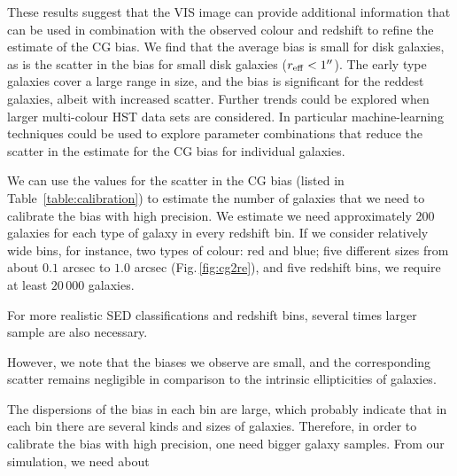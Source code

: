 \documentclass[useAMS,usenatbib]{mnras}
\begin{document}
These results suggest that the VIS image can provide additional information that can be 
used in combination with the observed colour and redshift to refine the estimate of the 
CG bias.  We find that the average bias is small for disk galaxies, as is the scatter
in the bias for small disk galaxies ($r_{\rm eff}<1''$). The early type galaxies cover
a large range in size, and the bias is significant for the reddest galaxies, albeit with
increased scatter. Further trends could be explored when larger multi-colour HST data sets
are considered. In particular machine-learning techniques could be used to explore 
parameter combinations that reduce the scatter in the estimate for the CG bias for individual galaxies.

We can use the values for the scatter in the CG bias (listed in Table~\ref{table:calibration}) to
estimate  the number of galaxies that we need to calibrate the bias with high precision. We estimate
we need approximately $200$ galaxies for each type of galaxy in every redshift bin. If we consider
relatively wide bins, for instance, two types of colour: red and blue; five different sizes from
about $0.1$ arcsec to $1.0$ arcsec (Fig.\,\ref{fig:cg2re}), and five redshift bins, we require at least 
$20\,000$ galaxies. 


For more
 realistic SED classifications and redshift bins, several times larger
sample are also necessary.




However, we note that the biases we observe are small, and the corresponding scatter remains
negligible in comparison to the intrinsic ellipticities of galaxies.



The dispersions of
the bias in each bin are large, which probably indicate that in each
bin there are several kinds and sizes of galaxies. Therefore, in
order to calibrate the bias with high precision, one need bigger
galaxy samples. From our simulation, we need about 
\end{document}
